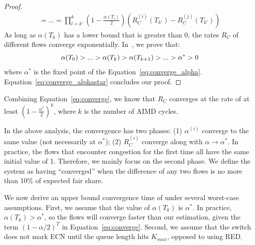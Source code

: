 \begin{proof}
\begin{equation}
\begin{array}{l}
 = ... = \prod\limits_{l = k'}^k {\left( {1 - \frac{{\alpha ({T_l})}}{2}} \right)} \left( {R_C^{(i)}({T_{k'}}) - R_C^{(j)}({T_{k'}})} \right)
\end{array}
\label{eq:converge}
\end{equation}
As long as $\alpha ({T_k})$ has a lower bound that is greater than 0, the rates $R_C$ of different flows 
converge exponentially. In~\cite{fullpaper}, we prove that:
\begin{equation}
\small
\alpha ({T_0}) > ... > \alpha ({T_k}) > \alpha ({T_{k + 1}}) > ... > {\alpha ^*} > 0
\label{eq:converge_alphastar}
\end{equation}
where $\alpha^{*}$ is the fixed point of the Equation~\ref{eq:converge_alpha}.
Equation~\ref{eq:converge_alphastar} concludes our proof. 
\end{proof}
Combining Equation~\ref{eq:converge}, we know that $R_C$ converges at the rate
of at least $( {1 - \frac{{{\alpha ^{*}}}}{2}} )^k$, where $k$ is the number of
AIMD cycles.



In the above analysis, the convergence has two phases: (1) $\alpha ^{(i)}$
converge to the same value (not necessarily at $\alpha^*$); (2) $R_C^{(i)}$
converge along with $\alpha \to \alpha^*$.  In practice, the flows that
encounter congestion for the first time all have the same initial value of 1.
Therefore, we mainly focus on the second phase. We define the system as having
``converged'' when the difference of any two flows is no more than 10\% of
expected fair share.

We now derive an upper bound convergence time of under several worst-case
assumptions. First, we assume that the value of $\alpha ({T_k})$ is $\alpha ^*$.
In practice, $\alpha ({T_k}) > \alpha ^*$, so the flows will converge faster
than our estimation, given the term $(1 - \alpha /2)^T$ in
Equation~\ref{eq:converge}.  Second, we assume that the switch does not mark ECN
until the queue length hits $K_{max}$, opposed to using RED. 

